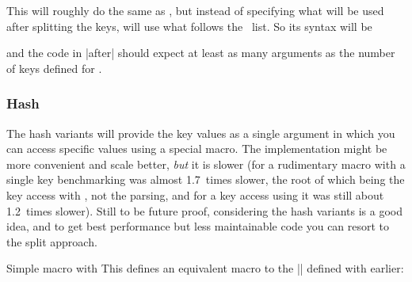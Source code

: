 \begin{function}{\ekvcSplitAndUse}
  \begin{syntax}
  \end{syntax}
  This will roughly do the same as , but instead of
  specifying what will be used after splitting the keys,  will use what
  follows the \kv\ list. So its syntax will be
\end{function}
\begin{quote}
  \ttfamily
  \kvarg{}
\end{quote}
and the code in |after| should expect at least as many arguments as the number
of keys defined for .


\subsubsection{Hash\label{sec:c:hash}}

The hash variants will provide the key values as a single argument in which you
can access specific values using a special macro. The implementation might be
more convenient and scale better, \emph{but} it is slower (for a rudimentary
macro with a single key benchmarking was almost 1.7~times slower, the root of
which being the key access with , not the parsing, and for a key
access using  it was still about 1.2~times slower). Still to
be future proof, considering the hash variants is a good idea, and to get best
performance but less maintainable code you can resort to the split approach.

\begin{example}{Simple macro with }
  This defines an equivalent macro to the |\foo| defined with 
  earlier:
  \begin{enverb}
    \ekvcHash{}
    \foo{}
  \end{enverb}
\end{example}

